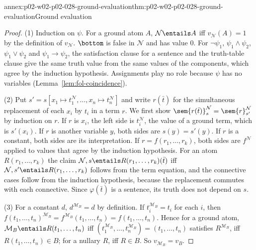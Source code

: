 \begin{annexitem}{annex:p02-w02-p02-028-ground-evaluation}{thm:p02-w02-p02-028-ground-evaluation}{Ground evaluation}
\begin{proof}
(1) Induction on \(\psi\).  For a ground atom \(A\),
\(\mathcal N\entails A\) iff \(v_{\mathcal N}(A)=1\) by the definition of
\(v_{\mathcal N}\).  \(\bottom\) is false in \(\mathcal N\) and has value \(0\).
For \(\neg\psi_1\), \(\psi_1\land\psi_2\), \(\psi_1\lor\psi_2\) and
\(\psi_1\to\psi_2\), the satisfaction clause for a sentence and the
truth-table clause give the same truth value from the same values of the
components, which agree by the induction hypothesis.  Assignments play no
role because \(\psi\) has no variables (Lemma~\ref{lem:fol-coincidence}).

(2) Put \(s'=s[x_1\mapsto t_1^{\mathcal N},\ldots,x_n\mapsto t_n^{\mathcal N}]\)
and write \(r(\bar t)\) for the simultaneous replacement of each \(x_i\) by
\(t_i\) in a term \(r\).  We first show
\(\sem{r(\bar t)}^{\mathcal N}_s=\sem{r}^{\mathcal N}_{s'}\) by induction on
\(r\).  If \(r\) is \(x_i\), the left side is \(t_i^{\mathcal N}\), the value
of a ground term, which is \(s'(x_i)\).  If \(r\) is another variable \(y\),
both sides are \(s(y)=s'(y)\).  If \(r\) is a constant, both sides are its
interpretation.  If \(r=f(r_1,\ldots,r_k)\), both sides are
\(f^{\mathcal N}\) applied to values that agree by the induction hypothesis.
For an atom \(R(r_1,\ldots,r_k)\) the claim
\(\mathcal N,s\entails R(r_1,\ldots,r_k)(\bar t)\) iff
\(\mathcal N,s'\entails R(r_1,\ldots,r_k)\) follows from the term equation,
and the connective cases follow from the induction hypothesis, because the
replacement commutes with each connective.  Since \(\varphi(\bar t)\) is a
sentence, its truth does not depend on \(s\).

(3) For a constant \(d\), \(d^{\mathcal M_B}=d\) by definition.  If
\(t_i^{\mathcal M_B}=t_i\) for each \(i\), then
\(f(t_1,\ldots,t_n)^{\mathcal M_B}=f^{\mathcal M_B}(t_1,\ldots,t_n)=f(t_1,\ldots,t_n)\).
Hence for a ground atom,
\(\mathcal M_B\entails R(t_1,\ldots,t_n)\) iff
\((t_1^{\mathcal M_B},\ldots,t_n^{\mathcal M_B})=(t_1,\ldots,t_n)\) satisfies
\(R^{\mathcal M_B}\), iff \(R(t_1,\ldots,t_n)\in B\); for a nullary \(R\),
iff \(R\in B\).  So \(v_{\mathcal M_B}=v_B\).
\end{proof}
\end{annexitem}

